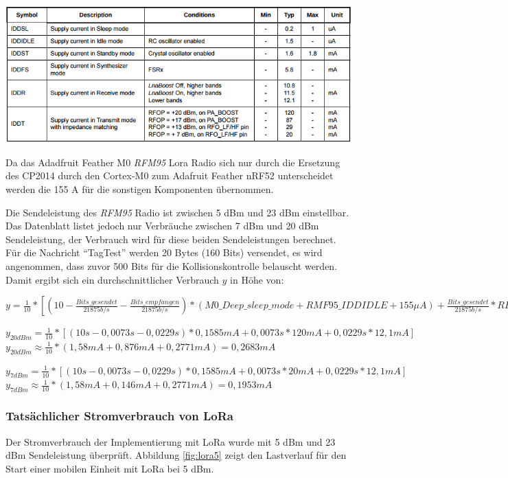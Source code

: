 \begin{table}[h]
  \centering
  \caption{Stromverbrauch des \emph{RFM95}, aus \cite{hope2006rfm}}
	\includegraphics[width=\textwidth]{images/lorapower.png}
  \label{table:lorapower}
\end{table}

Da das Adadfruit Feather M0 \emph{RFM95} Lora Radio sich nur durch die Ersetzung des CP2014 durch den Cortex-M0 zum Adafruit Feather nRF52 unterscheidet werden die 155 \textmu A für die sonstigen Komponenten übernommen.

Die Sendeleistung des \emph{RFM95} Radio ist zwischen 5 dBm und 23 dBm einstellbar. 
Das Datenblatt listet jedoch nur Verbräuche zwischen 7 dBm und 20 dBm Sendeleistung, der Verbrauch wird für diese beiden Sendeleistungen berechnet.
Für die Nachricht "`TagTest"' werden 20 Bytes (160 Bits) versendet, es wird angenommen, dass zuvor 500 Bits für die Kollisionskontrolle belauscht werden.
Damit ergibt sich ein durchschnittlicher Verbrauch $y$ in Höhe von: 

$y = \frac{1}{10} * [(10 - \frac{Bits\_gesendet}{21875 b/s} - \frac{Bits\_empfangen}{21875 b/s}) * (M0\_Deep\_sleep\_mode + RMF95\_IDDIDLE + 155 {\mu}A) + \frac{Bits\_gesendet}{21875 b/s} * RFM95\_XdBm + \frac{Bits\_empfangen}{21875 b/s} * RFM95\_IDDR]$

$y_{20dBm} = \frac{1}{10} * [(10s - 0,0073s - 0,0229s) * 0,1585mA + 0,0073s * 120mA + 0,0229s * 12,1mA]$\\[0.5cm]
$y_{20dBm} \approx \frac{1}{10} * (1,58mA + 0,876mA + 0,2771mA) = 0,2683mA$

$y_{7dBm} = \frac{1}{10} * [(10s - 0,0073s - 0,0229s) * 0,1585mA + 0,0073s * 20mA + 0,0229s * 12,1mA]$\\[0.5cm]
$y_{7dBm} \approx \frac{1}{10} * (1,58mA + 0,146mA + 0,2771mA) = 0,1953mA$

\subsubsection{Tatsächlicher Stromverbrauch von LoRa}
\label{ch:phase3:sec:powerlora}
Der Stromverbrauch der Implementierung mit LoRa wurde mit 5 dBm und 23 dBm Sendeleistung überprüft.
Abbildung \ref{fig:lora5} zeigt den Lastverlauf für den Start einer mobilen Einheit mit LoRa bei 5 dBm.

